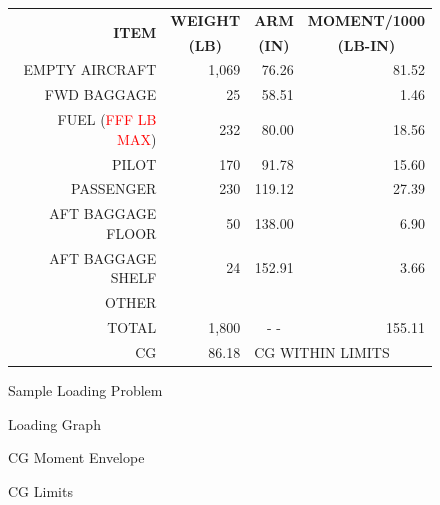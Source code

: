 \begin{figure}

\begin{center}
  \settowidth{\colOne}{AFT BAGGAGE FLOOR}
  \begin{tabular}{|r|r|r|r|}
    \hline
    \multirow{2}{\colOne}{\centering\bfseries{ITEM}}&\multicolumn{1}{|c|}{\bfseries{WEIGHT}}&\multicolumn{1}{c|}{\bfseries{ARM}}& \multicolumn{1}{c|}{\bfseries{MOMENT/1000}}\\
    &\multicolumn{1}{|c|}{\bfseries{(LB)}}&\multicolumn{1}{c|}{\bfseries{(IN)}}& \multicolumn{1}{c|}{\bfseries{(LB-IN)}}\\
    \hline\hline
    EMPTY AIRCRAFT&1,069&76.26&81.52\\
    \hline
    FWD BAGGAGE&25&58.51&1.46\\
    \hline
    FUEL (\textcolor{red}{FFF LB MAX})&232&80.00&18.56\\
    \hline
    PILOT&170&91.78&15.60\\
    \hline
    PASSENGER&230&119.12&27.39\\
    \hline
    AFT BAGGAGE FLOOR&50&138.00&6.90\\
    \hline
    AFT BAGGAGE SHELF&24&152.91&3.66\\
    \hline
    OTHER&&&\\
    \hline \hline
   TOTAL&1,800&\multicolumn{1}{c|}{- -}&155.11\\
    \hline
    \multicolumn{1}{r|}{CG}&86.18&\multicolumn{2}{l}{CG WITHIN LIMITS}\\
    \cline{2-2}
    \end{tabular}

  \caption{Sample Loading Problem}
  \label{Sample-Loading-Problem}
  \end{center}
  \end{figure}

\begin{figure}

\begin{center}
  
  \end{center}

\caption{Loading Graph}
\label{Loading-Graph}
\end{figure}

\begin{figure}
\begin{center}
  \end{center}

\caption{CG Moment Envelope}
\label{CG-Moment}
\end{figure}

\begin{figure}
\begin{center}
  \end{center}
\caption{CG Limits}
\label{CG-chart}
\end{figure}

\cleardoublepage
